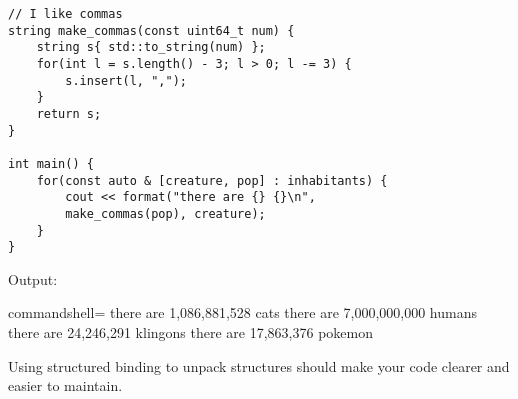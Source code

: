 \begin{itemize}
\begin{lstlisting}[style=styleCXX]
// I like commas
string make_commas(const uint64_t num) {
	string s{ std::to_string(num) };
	for(int l = s.length() - 3; l > 0; l -= 3) {
		s.insert(l, ",");
	}
	return s;
}

int main() {
	for(const auto & [creature, pop] : inhabitants) {
		cout << format("there are {} {}\n",
		make_commas(pop), creature);
	}
}
\end{lstlisting}

Output:

\begin{tcblisting}{commandshell={}}
there are 1,086,881,528 cats
there are 7,000,000,000 humans
there are 24,246,291 klingons
there are 17,863,376 pokemon
\end{tcblisting}

Using structured binding to unpack structures should make your code clearer and easier to maintain.
\end{itemize}












